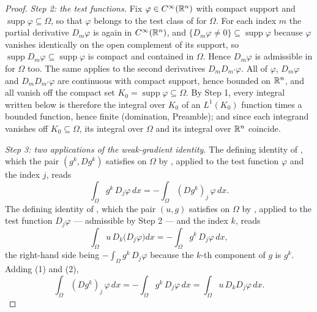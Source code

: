 \begin{proof}
\emph{Step 2: the test functions.}  Fix $\varphi\in C^\infty(\mathbb{R}^n)$ with compact
support and $\operatorname{supp}\varphi\subseteq\Omega$, so that $\varphi$
belongs to the test class of  for $\Omega$.  For each
index $m$ the partial derivative $D_m\varphi$ is again in $C^\infty(\mathbb{R}^n)$, and
$\{D_m\varphi\ne0\}\subseteq\operatorname{supp}\varphi$ because $\varphi$
vanishes identically on the open complement of its support, so
$\operatorname{supp}D_m\varphi\subseteq\operatorname{supp}\varphi$ is compact
and contained in $\Omega$.  Hence $D_m\varphi$ is admissible in
 for $\Omega$ too.  The same applies to the second
derivatives $D_mD_{m'}\varphi$.  All of $\varphi$, $D_m\varphi$ and
$D_mD_{m'}\varphi$ are continuous with compact support, hence bounded on
$\mathbb{R}^n$, and all vanish off the compact set
$K_0=\operatorname{supp}\varphi\subseteq\Omega$.  By Step 1, every integral
written below is therefore the integral over $K_0$ of an $L^1(K_0)$ function
times a bounded function, hence finite (domination, Preamble); and since each
integrand vanishes off $K_0\subseteq\Omega$, its integral over $\Omega$ and its
integral over $\mathbb{R}^n$ coincide.

\emph{Step 3: two applications of the weak-gradient identity.}  The defining
identity of , which the pair $(g^k,Dg^k)$ satisfies
on $\Omega$ by , applied to the test function $\varphi$ and
the index $j$, reads
\[
\int_\Omega g^k\,D_j\varphi\,dx=-\int_\Omega (Dg^k)_j\,\varphi\,dx .
\tag{1}
\]
The defining identity of , which the pair $(u,g)$
satisfies on $\Omega$ by , applied to the test function
$D_j\varphi$ --- admissible by Step 2 --- and the index $k$, reads
\[
\int_\Omega u\,D_k\bigl(D_j\varphi\bigr)dx=-\int_\Omega g^k\,D_j\varphi\,dx ,
\tag{2}
\]
the right-hand side being $-\int_\Omega g^k\,D_j\varphi$ because the $k$-th
component of $g$ is $g^k$.  Adding (1) and (2),
\[
\int_\Omega (Dg^k)_j\,\varphi\,dx
=-\int_\Omega g^k\,D_j\varphi\,dx
=\int_\Omega u\,D_kD_j\varphi\,dx .
\tag{3}
\]


\end{proof}
